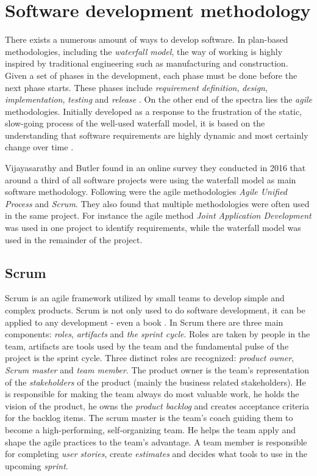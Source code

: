 
\section{Software development methodology}

There exists a numerous amount of ways to develop software. In plan-based
methodologies, including the \textit{waterfall model}, the way of working is
highly inspired by traditional engineering such as manufacturing and
construction. Given a set of phases in the development, each phase must be done
before the next phase starts. These phases include \textit{requirement
definition}, \textit{design}, \textit{implementation}, \textit{testing} and
\textit{release} \cite{crookshanks2014practical}. On the other end of the
spectra lies the \textit{agile} methodologies. Initially developed as a
response to the frustration of the static, slow-going process of the well-used
waterfall model, it is based on the understanding that software requirements
are highly dynamic and most certainly change over time
\cite{moniruzzaman2013comparative}.

Vijayasarathy and Butler \cite{vijayasarathy2016choice} found in an online
survey they conducted in 2016 that around a third of all software projects were
using the waterfall model as main software methodology. Following were the
agile methodologies \textit{Agile Unified Process} and \textit{Scrum}. They
also found that multiple methodologies were often used in the same project.
For instance the agile method \textit{Joint Application Development} was used
in one project to identify requirements, while the waterfall model was used in
the remainder of the project.

\subsection{Scrum}

Scrum is an agile framework utilized by small teams to develop simple and
complex products. Scrum is not only used to do software development, it can be
applied to any development - even a book \cite{sims2012scrum}. In Scrum there
are three main components: \textit{roles}, \textit{artifacts} and \textit{the
sprint cycle}. Roles are taken by people in the team, artifacts are tools used
by the team and the fundamental pulse of the project is the sprint cycle. Three
distinct roles are recognized: \textit{product owner}, \textit{Scrum master}
and \textit{team member}. The product owner is the team's representation of the
\textit{stakeholders} of the product (mainly the business related
stakeholders). He is responsible for making the team always do most valuable
work, he holds the vision of the product, he owns the \textit{product backlog}
and creates acceptance criteria for the backlog items. The scrum master is the
team's coach guiding them to become a high-performing, self-organizing team. He
helps the team apply and shape the agile practices to the team's advantage. A
team member is responsible for completing \textit{user stories}, create
\textit{estimates} and decides what tools to use in the upcoming
\textit{sprint}. \cite{sims2012scrum}

